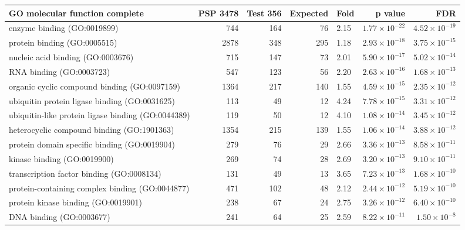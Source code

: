 \begin{table}[ht]
\centering
\begin{adjustbox}{width=\textwidth}
\begin{tabular}{lrrrlrr}
  \hline
GO molecular function complete & PSP 3478 & Test 356 & Expected & Fold & p value & FDR \\ 
  \hline
 enzyme binding (GO:0019899) & 744 & 164 & 76 & 2.15 & $1.77 \times 10^{-22}$ & $4.52 \times 10^{-19}$ \\ 
  protein binding (GO:0005515) & 2878 & 348 & 295 & 1.18 & $2.93 \times 10^{-18}$ & $3.75 \times 10^{-15}$ \\ 
  nucleic acid binding (GO:0003676) & 715 & 147 & 73 & 2.01 & $5.90 \times 10^{-17}$ & $5.02 \times 10^{-14}$ \\ 
  RNA binding (GO:0003723) & 547 & 123 & 56 & 2.20 & $2.63 \times 10^{-16}$ & $1.68 \times 10^{-13}$ \\ 
  organic cyclic compound binding (GO:0097159) & 1364 & 217 & 140 & 1.55 & $4.59 \times 10^{-15}$ & $2.35 \times 10^{-12}$ \\ 
  ubiquitin protein ligase binding (GO:0031625) & 113 & 49 & 12 & 4.24 & $7.78 \times 10^{-15}$ & $3.31 \times 10^{-12}$ \\ 
  ubiquitin-like protein ligase binding (GO:0044389) & 119 & 50 & 12 & 4.10 & $1.08 \times 10^{-14}$ & $3.45 \times 10^{-12}$ \\ 
  heterocyclic compound binding (GO:1901363) & 1354 & 215 & 139 & 1.55 & $1.06 \times 10^{-14}$ & $3.88 \times 10^{-12}$ \\ 
  protein domain specific binding (GO:0019904) & 279 & 76 & 29 & 2.66 & $3.36 \times 10^{-13}$ & $8.58 \times 10^{-11}$ \\ 
  kinase binding (GO:0019900) & 269 & 74 & 28 & 2.69 & $3.20 \times 10^{-13}$ & $9.10 \times 10^{-11}$ \\ 
  transcription factor binding (GO:0008134) & 131 & 49 & 13 & 3.65 & $7.23 \times 10^{-13}$ & $1.68 \times 10^{-10}$ \\ 
  protein-containing complex binding (GO:0044877) & 471 & 102 & 48 & 2.12 & $2.44 \times 10^{-12}$ & $5.19 \times 10^{-10}$ \\ 
  protein kinase binding (GO:0019901) & 238 & 67 & 24 & 2.75 & $3.26 \times 10^{-12}$ & $6.40 \times 10^{-10}$ \\ 
  DNA binding (GO:0003677) & 241 & 64 & 25 & 2.59 & $8.22 \times 10^{-11}$ & $1.50 \times 10^{-8}$ \\ 

\end{tabular}
\end{adjustbox}
\end{table}
